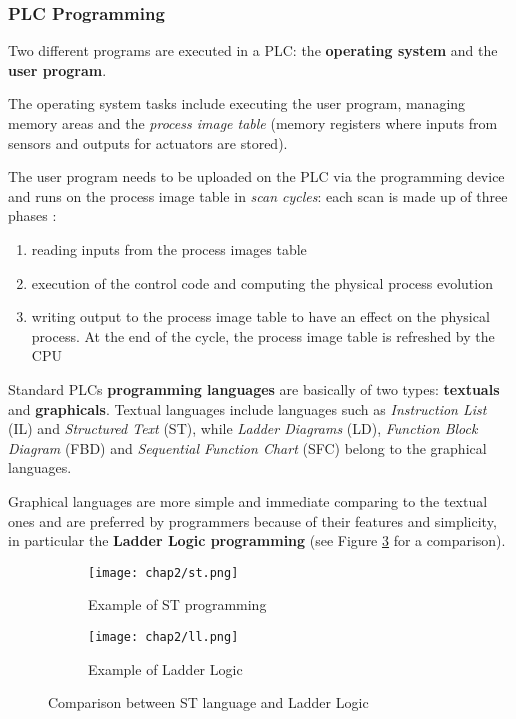 \subsubsection{PLC Programming}
\label{subsubsec:plc_programming}
Two different programs are executed in a PLC: the \textbf{operating system} and the \textbf{user program}.

\bigskip
The operating system tasks include executing the user program, managing memory areas and the \textit{process image table} (memory registers where inputs from sensors and outputs for actuators are stored).

\bigskip
The user program needs to be uploaded on the PLC via the programming device and runs on the process image table in \textit{scan cycles}: each scan is made up of three phases \cite{ceccato}:

\begin{enumerate}
	\item reading inputs from the process images table
	\item execution of the control code and computing the physical process evolution
	\item writing output to the process image table to have an effect on the physical process. At the end of the cycle, the process image table is refreshed by the CPU
\end{enumerate}

Standard PLCs \textbf{programming languages} are basically of two types: \textbf{textuals} and \textbf{graphicals}.
Textual languages include languages such as \textit{Instruction List} (IL) and \textit{Structured Text} (ST), while \textit{Ladder Diagrams} (LD), \textit{Function Block Diagram} (FBD) and \textit{Sequential Function Chart} (SFC) belong to the graphical languages.

\bigskip
Graphical languages are more simple and immediate comparing to the textual ones and are preferred by programmers because of their features and simplicity, in particular the \textbf{Ladder Logic programming} (see Figure \ref{fig:st_ll_comparison} for a comparison).

\begin{figure}[ht]
	\centering
	\begin{subfigure}{0.47\textwidth}
		\texttt{[image: chap2/st.png]}
		\caption{Example of ST programming}
		\label{subfig:st_example}
	\end{subfigure}
	\hfill
	\begin{subfigure}{0.47\textwidth}
		\texttt{[image: chap2/ll.png]}
		\caption{Example of Ladder Logic}
		\label{subfig:ladder_logic_example}
	\end{subfigure}
	\caption{Comparison between ST language and Ladder Logic}
	\label{fig:st_ll_comparison}
	
\end{figure}

